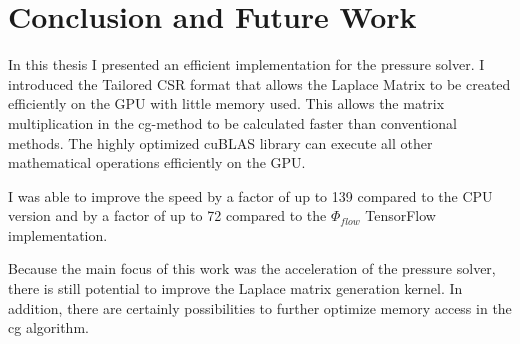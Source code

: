 
\chapter{Conclusion and Future Work}\label{chapter:conclusion}
In this thesis I presented an efficient implementation for the pressure solver. I introduced the Tailored CSR format that allows the Laplace Matrix to be created efficiently on the GPU with little memory used. This allows the matrix multiplication in the cg-method to be calculated faster than conventional methods. The highly optimized cuBLAS library can execute all other mathematical operations efficiently on the GPU.\\
\par I was able to improve the speed by a factor of up to 139 compared to the CPU version and by a factor of up to 72 compared to the $\Phi_{flow}$ TensorFlow implementation.\\
\par Because the main focus of this work was the acceleration of the pressure solver, there is still potential to improve the Laplace matrix generation kernel. In addition, there are certainly possibilities to further optimize memory access in the cg algorithm. 
